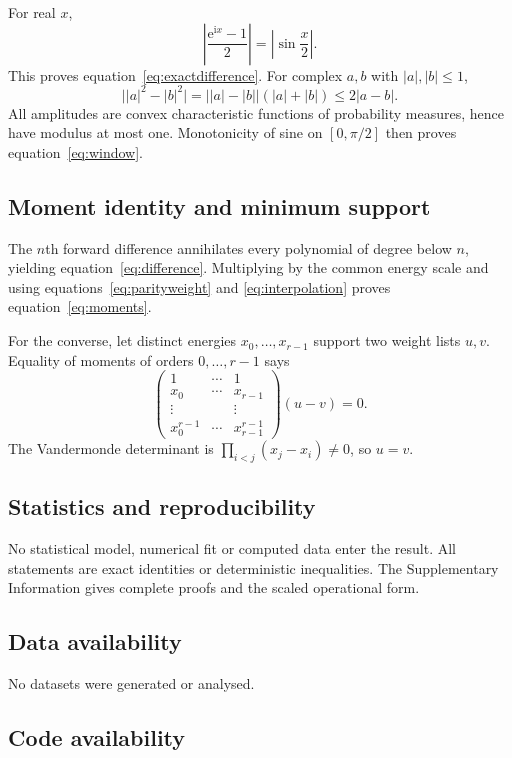 \documentclass[12pt]{article}
\newcommand{\ee}{\mathrm e}
\newcommand{\ii}{\mathrm i}
\begin{document}
For real \(x\),
\[
\left|\frac{\ee^{\ii x}-1}{2}\right|=\left|\sin\frac{x}{2}\right|.
\]
This proves equation~\eqref{eq:exactdifference}. For complex \(a,b\) with
\(|a|,|b|\leq1\),
\[
\bigl||a|^2-|b|^2\bigr|
=\bigl||a|-|b|\bigr|(|a|+|b|)
\leq2|a-b|.
\]
All amplitudes are convex characteristic functions of probability
measures, hence have modulus at most one. Monotonicity of sine on
\([0,\pi/2]\) then proves equation~\eqref{eq:window}.

\subsection*{Moment identity and minimum support}

The \(n\)th forward difference annihilates every polynomial of degree below
\(n\), yielding equation~\eqref{eq:difference}. Multiplying by the common
energy scale and using equations~\eqref{eq:parityweight} and
\eqref{eq:interpolation} proves equation~\eqref{eq:moments}.

For the converse, let distinct energies \(x_0,\ldots,x_{r-1}\) support two
weight lists \(u,v\). Equality of moments of orders \(0,\ldots,r-1\) says
\[
\begin{pmatrix}
1&\cdots&1\\
x_0&\cdots&x_{r-1}\\
\vdots&&\vdots\\
x_0^{r-1}&\cdots&x_{r-1}^{r-1}
\end{pmatrix}(u-v)=0.
\]
The Vandermonde determinant is
\(\prod_{i<j}(x_j-x_i)\neq0\), so \(u=v\).

\subsection*{Statistics and reproducibility}

No statistical model, numerical fit or computed data enter the result. All
statements are exact identities or deterministic inequalities. The
Supplementary Information gives complete proofs and the scaled operational
form.

\subsection*{Data availability}

No datasets were generated or analysed.

\subsection*{Code availability}
\end{document}
